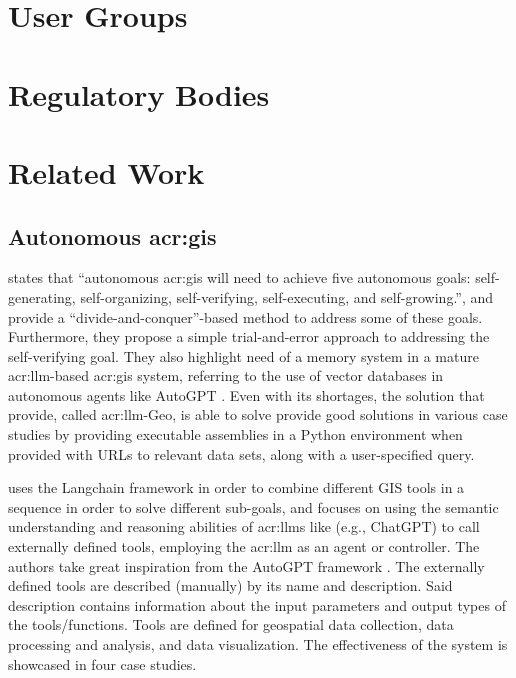 \section{User Groups}\label{sec:user-groups}



\section{Regulatory Bodies}\label{regulatory-bodies}

\section{Related Work}\label{related-work}

\subsection[Autonomous GIS]{Autonomous \acrshort{acr:gis}}\label{subsec:autonomous-gis}

\cite{liAutonomousGISNextgeneration2023} states that “autonomous \acrshort{acr:gis} will need to achieve five autonomous goals: self-generating, self-organizing, self-verifying, self-executing, and self-growing.”, and provide a “divide-and-conquer”-based method to address some of these goals. Furthermore, they propose a simple trial-and-error approach to addressing the self-verifying goal. They also highlight need of a memory system in a mature \gls{acr:llm}-based \gls{acr:gis} system, referring to the use of vector databases in autonomous agents like AutoGPT \citep{richardAutoGPTHeartOpensource2023}. Even with its shortages, the solution that \citep{liAutonomousGISNextgeneration2023} provide, called \acrshort{acr:llm}-Geo, is able to solve provide good solutions in various case studies by providing executable assemblies in a Python environment when provided with URLs to relevant data sets, along with a user-specified query.

\cite{zhangGeoGPTUnderstandingProcessing2023} uses the Langchain framework \citep{chaseLangChain2022} in order to combine different GIS tools in a sequence in order to solve different sub-goals, and focuses on using the semantic understanding and reasoning abilities of \glspl{acr:llm} like (e.g., ChatGPT) to call externally defined tools, employing the \gls{acr:llm} as an agent or controller. The authors take great inspiration from the AutoGPT framework \citep{richardAutoGPTHeartOpensource2023}. The externally defined tools are described (manually) by its name and description. Said description contains information about the input parameters and output types of the tools/functions. Tools are defined for geospatial data collection, data processing and analysis, and data visualization. The effectiveness of the system is showcased in four case studies.

